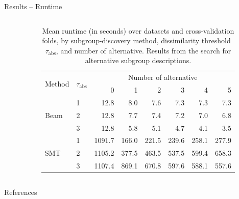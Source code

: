 \documentclass[en, navbaroff, handout]{sdqbeamer}
\begin{document}
\begin{frame}[t]{Results -- Runtime}
\begin{columns}[T]
\begin{column}{\kitthreecolumns}
\begin{table}
			\end{table}
		\end{column}
		\begin{column}{\kitthreecolumns}
			\begin{table}[t]
				\centering
				\caption*{
					Mean runtime (in seconds) over datasets and cross-validation folds, by subgroup-discovery method, dissimilarity threshold~$\tau_{\text{abs}}$, and number of alternative.
					Results from the search for alternative subgroup descriptions.
				}
				\begin{tabular}{llrrrrrr}
					\toprule
					\multirow{2}{*}{Method} & \multirow{2}{*}{$\tau_{\text{abs}}$} & \multicolumn{6}{c}{Number of alternative} \\
					\cmidrule(lr){3-8}
					& & 0 & 1 & 2 & 3 & 4 & 5 \\
					\midrule
					\multirow[t]{3}{*}{Beam} & 1 & 12.8 & 8.0 & 7.6 & 7.3 & 7.3 & 7.3 \\
					& 2 & 12.8 & 7.7 & 7.4 & 7.2 & 7.0 & 6.8 \\
					& 3 & 12.8 & 5.8 & 5.1 & 4.7 & 4.1 & 3.5 \\
					\multirow[t]{3}{*}{SMT} & 1 & 1091.7 & 166.0 & 221.5 & 239.6 & 258.1 & 277.9 \\
					& 2 & 1105.2 & 377.5 & 463.5 & 537.5 & 599.4 & 658.3 \\
					& 3 & 1107.4 & 869.1 & 670.8 & 597.6 & 588.1 & 557.6 \\
					\bottomrule
				\end{tabular}
				\label{tab:csd:alteratives-runtime}
			\end{table}
		\end{column}
	\end{columns}
\end{frame}

\begin{frame}[t, allowframebreaks]{References}
	\printbibliography
\end{frame}

\backupend
\end{document}
